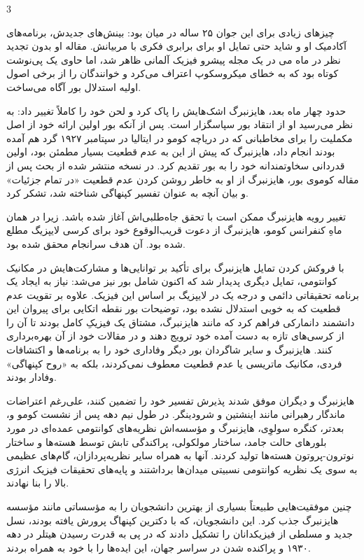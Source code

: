 \documentclass[11pt,a4paper]{article}
\begin{document}
\setlength{\columnsep}{0.8cm}
\begin{multicols}{3}

چیزهای زیادی برای این جوان ۲۵ ساله در میان بود: بینش‌های جدیدش، برنامه‌های آکادمیک او و شاید حتی تمایل او برای برابری فکری با مربیانش. مقاله او بدون تجدید نظر در ماه می در یک مجله پیشرو فیزیک آلمانی ظاهر شد، اما حاوی یک پی‌نوشت کوتاه بود که به خطای میکروسکوپ اعتراف می‌کرد و خوانندگان را از برخی اصول اولیه استدلال بور آگاه می‌ساخت.

حدود چهار ماه بعد، هایزنبرگ اشک‌هایش را پاک کرد و لحن خود را کاملاً تغییر داد: به نظر می‌رسید او از انتقاد بور سپاسگزار است. پس از آنکه بور اولین ارائه خود از اصل مکملیت را برای مخاطبانی که در دریاچه کومو در ایتالیا در سپتامبر ۱۹۲۷ گرد هم آمده بودند انجام داد، هایزنبرگ که پیش از این به عدم قطعیت بسیار مطمئن بود، اولین قدردانی سخاوتمندانه خود را به بور تقدیم کرد. در نسخه منتشر شده از بحث پس از مقاله کوموی بور، هایزنبرگ از او به خاطر روشن کردن عدم قطعیت «در تمام جزئیات» و بیان آنچه به عنوان تفسیر کپنهاگی شناخته شد، تشکر کرد.

تغییر رویه هایزنبرگ ممکن است با تحقق جاه‌طلبی‌اش آغاز شده باشد. زیرا در همان ماهِ کنفرانس کومو، هایزنبرگ از دعوت قریب‌الوقوع خود برای کرسی لایپزیگ مطلع شده بود. آن هدف سرانجام محقق شده بود.

با فروکش کردن تمایل هایزنبرگ برای تأکید بر توانایی‌ها و مشارکت‌هایش در مکانیک کوانتومی، تمایل دیگری پدیدار شد که اکنون شامل بور نیز می‌شد: نیاز به ایجاد یک برنامه تحقیقاتی دائمی و درجه یک در لایپزیگ بر اساس این فیزیک. علاوه بر تقویت عدم قطعیت که به خوبی استدلال نشده بود، توضیحات بور نقطه اتکایی برای پیروان این دانشمند دانمارکی فراهم کرد که مانند هایزنبرگ، مشتاق یک فیزیکِ کامل بودند تا آن را از کرسی‌های تازه به دست آمده خود ترویج دهند و در مقالات خود از آن بهره‌برداری کنند. هایزنبرگ و سایر شاگردان بور دیگر وفاداری خود را به برنامه‌ها و اکتشافات فردی، مکانیک ماتریسی یا عدم قطعیت معطوف نمی‌کردند، بلکه به «روح کپنهاگی» وفادار بودند.

هایزنبرگ و دیگران موفق شدند پذیرش تفسیر خود را تضمین کنند، علی‌رغم اعتراضات ماندگار رهبرانی مانند اینشتین و شرودینگر. در طول نیم دهه پس از نشست کومو و، بعدتر، کنگره سولوِی، هایزنبرگ و مؤسسه‌اش نظریه‌های کوانتومی عمده‌ای در مورد بلورهای حالت جامد، ساختار مولکولی، پراکندگی تابش توسط هسته‌ها و ساختار نوترون-پروتون هسته‌ها تولید کردند. آنها به همراه سایر نظریه‌پردازان، گام‌های عظیمی به سوی یک نظریه کوانتومی نسبیتی میدان‌ها برداشتند و پایه‌های تحقیقات فیزیک انرژی بالا را بنا نهادند.

چنین موفقیت‌هایی طبیعتاً بسیاری از بهترین دانشجویان را به مؤسساتی مانند مؤسسه هایزنبرگ جذب کرد. این دانشجویان، که با دکترین کپنهاگ پرورش یافته بودند، نسل جدید و مسلطی از فیزیکدانان را تشکیل دادند که در پی به قدرت رسیدن هیتلر در دهه ۱۹۳۰ و پراکنده شدن در سراسر جهان، این ایده‌ها را با خود به همراه بردند.


\end{multicols}
\end{document}
